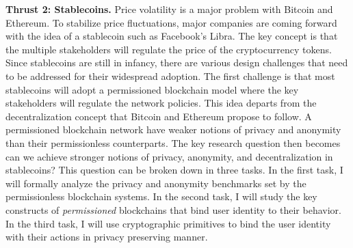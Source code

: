 \documentclass{NSF}
\newcommand{\BfPara}[1]{{\noindent\textbf{#1.}}\xspace}
\begin{document}
\BfPara{Thrust 2: Stablecoins} Price volatility is a major problem with Bitcoin and Ethereum. To stabilize price fluctuations, major companies are coming forward with the idea of a stablecoin such as Facebook's Libra. The key concept is that the multiple stakeholders will regulate the price of the cryptocurrency tokens. Since stablecoins are still in infancy, there are various design challenges that need to be addressed for their widespread adoption. The first challenge is that most stablecoins will adopt a permissioned blockchain model where the key stakeholders will regulate the network policies. This idea departs from the decentralization concept that Bitcoin and Ethereum propose to follow. A permissioned blockchain network have weaker notions of privacy and anonymity than their permissionless counterparts. The key research question then becomes can we achieve stronger notions of privacy, anonymity, and decentralization in stablecoins? This question can be broken down in three tasks. In the first task, I will formally analyze the privacy and anonymity benchmarks set by the permissionless blockchain systems. In the second task, I will study the key constructs of {\em permissioned} blockchains that bind user identity to their behavior. In the third task, I will use cryptographic primitives to bind the user identity with their actions in privacy preserving manner. 
\end{document}

